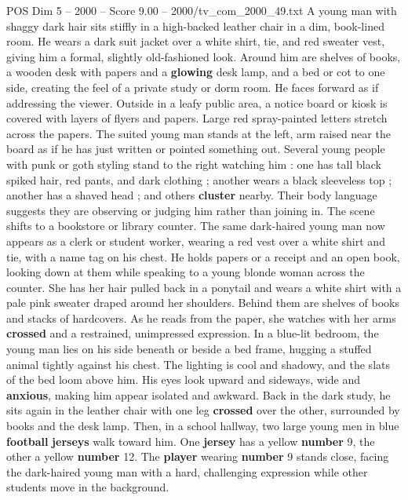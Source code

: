 \begin{textsample}{POS Dim 5 – 2000 – Score 9.00 – 2000/tv\_com\_2000\_49.txt}  \label{ex:f5_pos_024}
A young man with shaggy dark hair sits stiffly in a high-backed leather chair in a dim, book-lined room.
He wears a dark suit jacket over a white shirt, tie, and red sweater vest, giving him a formal, slightly old-fashioned look.
Around him are shelves of books, a wooden desk with papers and a \textbf{glowing} desk lamp, and a bed or cot to one side, creating the feel of a private study or dorm room.
He faces forward as if addressing the viewer.
Outside in a leafy public area, a notice board or kiosk is covered with layers of flyers and papers.
Large red spray-painted letters stretch across the papers.
The suited young man stands at the left, arm raised near the board as if he has just written or pointed something out.
Several young people with punk or goth styling stand to the right watching him : one has tall black spiked hair, red pants, and dark clothing ; another wears a black sleeveless top ; another has a shaved head ; and others \textbf{cluster} nearby.
Their body language suggests they are observing or judging him rather than joining in.
The scene shifts to a bookstore or library counter.
The same dark-haired young man now appears as a clerk or student worker, wearing a red vest over a white shirt and tie, with a name tag on his chest.
He holds papers or a receipt and an open book, looking down at them while speaking to a young blonde woman across the counter.
She has her hair pulled back in a ponytail and wears a white shirt with a pale pink sweater draped around her shoulders.
Behind them are shelves of books and stacks of hardcovers.
As he reads from the paper, she watches with her arms \textbf{crossed} and a restrained, unimpressed expression.
In a blue-lit bedroom, the young man lies on his side beneath or beside a bed frame, hugging a stuffed animal tightly against his chest.
The lighting is cool and shadowy, and the slats of the bed loom above him.
His eyes look upward and sideways, wide and \textbf{anxious}, making him appear isolated and awkward.
Back in the dark study, he sits again in the leather chair with one leg \textbf{crossed} over the other, surrounded by books and the desk lamp.
Then, in a school hallway, two large young men in blue \textbf{football} \textbf{jerseys} walk toward him.
One \textbf{jersey} has a yellow \textbf{number} 9, the other a yellow \textbf{number} 12.
The \textbf{player} wearing \textbf{number} 9 stands close, facing the dark-haired young man with a hard, challenging expression while other students move in the background.

\end{textsample}
